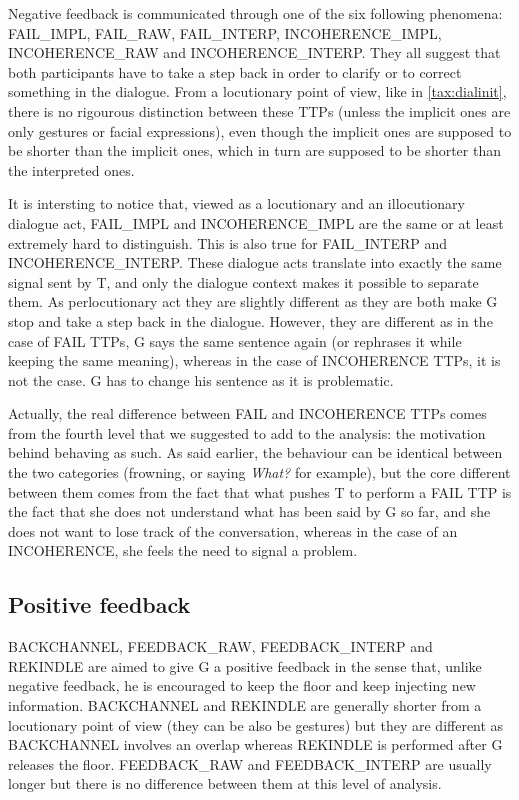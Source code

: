          Negative feedback is communicated through one of the six following phenomena: FAIL\_IMPL, FAIL\_RAW, FAIL\_INTERP, INCOHERENCE\_IMPL, INCOHERENCE\_RAW and INCOHERENCE\_INTERP. They all suggest that both participants have to take a step back in order to clarify or to correct something in the dialogue. From a locutionary point of view, like in \ref{tax:dialinit}, there is no rigourous distinction between these TTPs (unless the implicit ones are only gestures or facial expressions), even though the implicit ones are supposed to be shorter than the implicit ones, which in turn are supposed to be shorter than the interpreted ones.

         It is intersting to notice that, viewed as a locutionary and an illocutionary dialogue act, FAIL\_IMPL and INCOHERENCE\_IMPL are the same or at least extremely hard to distinguish. This is also true for FAIL\_INTERP and INCOHERENCE\_INTERP. These dialogue acts translate into exactly the same signal sent by T, and only the dialogue context makes it possible to separate them. As perlocutionary act they are slightly different as they are both make G stop and take a step back in the dialogue. However, they are different as in the case of FAIL TTPs, G says the same sentence again (or rephrases it while keeping the same meaning), whereas in the case of INCOHERENCE TTPs, it is not the case. G has to change his sentence as it is problematic.

         Actually, the real difference between FAIL and INCOHERENCE TTPs comes from the fourth level that we suggested to add to the analysis: the motivation behind behaving as such. As said earlier, the behaviour can be identical between the two categories (frowning, or saying \textit{What?} for example), but the core different between them comes from the fact that what pushes T to perform a FAIL TTP is the fact that she does not understand what has been said by G so far, and she does not want to lose track of the conversation, whereas in the case of an INCOHERENCE, she feels the need to signal a problem.

    \subsection{Positive feedback}
		
					BACKCHANNEL, FEEDBACK\_RAW, FEEDBACK\_INTERP and REKINDLE are aimed to give G a positive feedback in the sense that, unlike negative feedback, he is encouraged to keep the floor and keep injecting new information. BACKCHANNEL and REKINDLE are generally shorter from a locutionary point of view (they can be also be gestures) but they are different as BACKCHANNEL involves an overlap whereas REKINDLE is performed after G releases the floor. FEEDBACK\_RAW and FEEDBACK\_INTERP are usually longer but there is no difference between them at this level of analysis.
					
